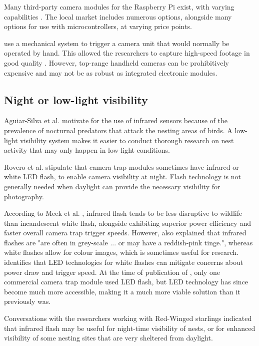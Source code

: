 \documentclass[class=report,11pt,crop=false]{standalone}
\begin{document}
Many third-party camera modules for the Raspberry Pi exist, with varying capabilities \cite{jolles2021broad-scale}. The local market includes numerous options, alongside many options for use with microcontrollers, at varying price points.

\cite{rico-guevara2017bring} use a mechanical system to trigger a camera unit that would normally be operated by hand. This allowed the researchers to capture high-speed footage in good quality \cite{rico-guevara2017bring}. However, top-range handheld cameras can be prohibitively expensive and may not be as robust as integrated electronic modules.

\subsection{Night or low-light visibility}

Aguiar-Silva et al. \cite{aguiar-silva2017camera} motivate for the use of infrared sensors because of the prevalence of nocturnal predators that attack the nesting areas of birds. A low-light visibility system makes it easier to conduct thorough research on nest activity that may only happen in low-light conditions.

Rovero et al. \cite{rovero2013which} stipulate that camera trap modules sometimes have infrared or white LED flash, to enable camera visibility at night. Flash technology is not generally needed when daylight can provide the necessary visibility for photography.

According to Meek et al. \cite{meek2012introduction}, infrared flash tends to be less disruptive to wildlife than incandescent white flash, alongside exhibiting superior power efficiency and faster overall camera trap trigger speeds. However, \cite{meek2012introduction} also explained that infrared flashes are "are often in grey-scale ... or may have a
reddish-pink tinge.", whereas white flashes allow for colour images, which is sometimes useful for research. \cite{meek2012introduction} identifies that LED technologies for white flashes can mitigate concerns about power draw and trigger speed. At the time of publication of \cite{meek2012introduction}, only one commercial camera trap module used LED flash, but LED technology has since become much more accessible, making it a much more viable solution than it previously was.

Conversations with the researchers working with Red-Winged starlings \cite{hofmeyer2024private} indicated that infrared flash may be useful for night-time visibility of nests, or for enhanced visibility of some nesting sites that are very sheltered from daylight.
\end{document}
